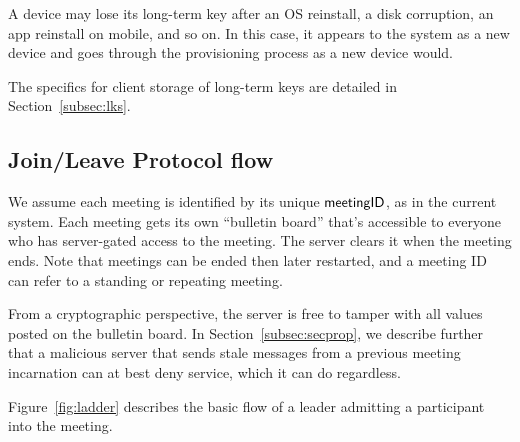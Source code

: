 A device may lose its long-term key after an OS reinstall, a disk corruption, an app reinstall on mobile, and so on. In this case, it appears to the system as a new device and goes through the provisioning process as a new device would.

The specifics for client storage of long-term keys are detailed in Section~\ref{subsec:lks}.

\subsection{Join/Leave Protocol flow}\label{subsec:joinleave}
We assume each meeting is identified by its unique ${\sf meetingID}$, as in the current system. Each meeting gets its own ``bulletin board'' that's accessible to everyone who has server-gated access to the meeting. The server clears it when the meeting ends. Note that meetings can be ended then later restarted, and a meeting ID can refer to a standing or repeating meeting.

From a cryptographic perspective, the server is free to tamper with all values posted on the bulletin board. In Section~\ref{subsec:secprop}, we describe further that a malicious server that sends stale messages from a previous meeting incarnation can at best deny service, which it can do regardless.

Figure~\ref{fig:ladder} describes the basic flow of a leader admitting a participant into the meeting.

\def\Bob{Bob}
\def\MMR{Zoom MMR}
\def\Keyserver{Zoom Keyserver}
\def\Alice{Alice}

